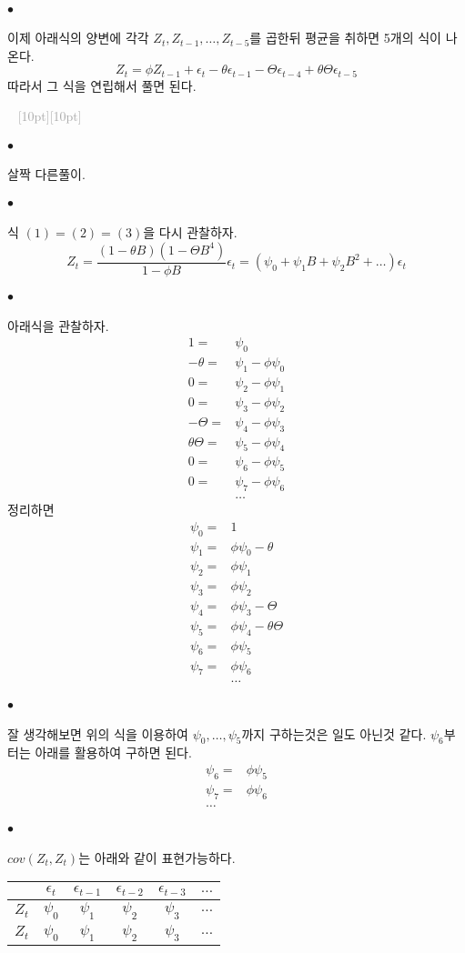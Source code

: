 \documentclass[12pt,oneside,english]{book}
\newcommand{\dash}{\vspace{2em}\noindent \textcolor{darkgray}{\hrulefill~ \raisebox{-2.5pt}[10pt][10pt]{\leafright \decofourleft \decothreeleft  \aldineright \decotwo \floweroneleft \decoone   \floweroneright \decotwo \aldineleft\decothreeright \decofourright \leafleft} ~  \hrulefill \\ \vspace{2em}}}
\def\ck{\paragraph{\Large$\bullet$}\Large}
\begin{document}
\ck 이제 아래식의 양변에 각각 $Z_t,Z_{t-1},\dots,Z_{t-5}$를 곱한뒤 평균을 취하면 5개의 식이 나온다. 
\[
Z_t=\phi Z_{t-1}+\epsilon_t-\theta \epsilon_{t-1} -\Theta \epsilon_{t-4} +\theta\Theta\epsilon_{t-5}
\]
따라서 그 식을 연립해서 풀면 된다. 

\dash 

\ck 살짝 다른풀이. 

\ck 식 $(1)=(2)=(3)$을 다시 관찰하자. 
\[
Z_t=\frac{(1-\theta B)(1-\Theta B^4)}{1-\phi B}\epsilon_t=(\psi_0+\psi_1 B+\psi_2 B^2 +\dots )\epsilon_{t}
\]

\ck 아래식을 관찰하자. 
\begin{align*}
1=&\psi_0 \\ 
-\theta=&\psi_1-\phi\psi_0 \\ 
0=&\psi_2-\phi\psi_1 \\
0=&\psi_3-\phi\psi_2 \\
-\Theta=&\psi_4-\phi\psi_3 \\
\theta\Theta=&\psi_5-\phi\psi_4 \\
0 =& \psi_6-\phi \psi_5 \\
0 =& \psi_7-\phi \psi_6 \\
& \dots 
\end{align*}
정리하면
\begin{align*}
\psi_0=&1 \\ 
\psi_1=&\phi\psi_0-\theta \\ 
\psi_2=&\phi\psi_1 \\
\psi_3=&\phi\psi_2 \\
\psi_4=&\phi\psi_3-\Theta \\
\psi_5=&\phi\psi_4-\theta\Theta \\
\psi_6=&\phi \psi_5 \\
\psi_7 =& \phi \psi_6 \\
& \dots 
\end{align*}

\ck 잘 생각해보면 위의 식을 이용하여 $\psi_0,\dots,\psi_5$까지 구하는것은 일도 아닌것 같다. $\psi_6$부터는 아래를 활용하여 구하면 된다. 
\begin{align*}
\psi_6=&\phi\psi_5 \\
\psi_7=&\phi\psi_6 \\ 
\dots 
\end{align*}

\ck $cov(Z_t,Z_t)$는 아래와 같이 표현가능하다. 
\begin{table}[h]
\center\Large
\begin{tabular}{|c|c|c|c|c|c|}
\hline
      & $\epsilon_t$      & $\epsilon_{t-1}$ & $\epsilon_{t-2}$ & $\epsilon_{t-3}$ & $\dots$ \\ \hline
$Z_t$ & $\psi_0$		  & $\psi_1$         & $\psi_2$         & $\psi_3$         & $\dots$ \\ \hline
$Z_t$ & $\psi_0$          & $\psi_1$         & $\psi_2$         & $\psi_3$         & $\dots$ \\ \hline
\end{tabular}
\end{table}
\end{document}
